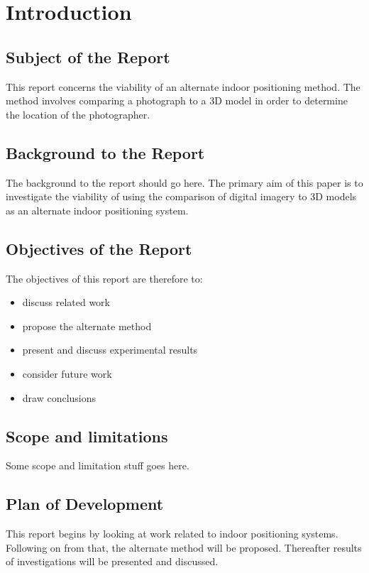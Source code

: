 \documentclass[11pt,a4paper]{article}
\begin{document}
\newpage
\tableofcontents

\setcounter{page}{0}

\newpage
\section{Introduction}
	\subsection{Subject of the Report}
		This report concerns the viability of an alternate indoor positioning method. The method involves comparing a photograph to a 3D model in order to determine the location of the photographer.
	
	\subsection{Background to the Report}
		The background to the report should go here.
		The primary aim of this paper is to investigate the viability of using the comparison of digital imagery to 3D models as an alternate indoor positioning system.
	
	\subsection{Objectives of the Report}
		The objectives of this report are therefore to:
		\begin{itemize}
			\item
				discuss related work
			\item
				propose the alternate method
			\item
				present and discuss experimental results
			\item
				 consider future work
			\item
				draw conclusions
		\end{itemize}
	
	\subsection{Scope and limitations}
		Some scope and limitation stuff goes here.
	
	\subsection{Plan of Development}
		This report begins by looking at work related to indoor positioning systems. Following on from that, the alternate method will be proposed. Thereafter results of investigations will be presented and discussed.
\end{document}

